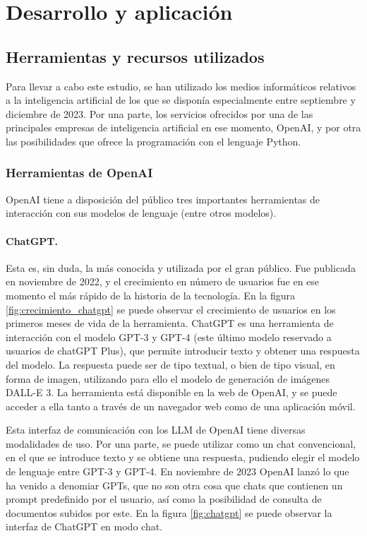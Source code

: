 \section{Desarrollo y aplicación}

\subsection{Herramientas y recursos utilizados}

Para llevar a cabo este estudio, se han utilizado los medios informáticos relativos a la inteligencia artificial de los que se disponía especialmente entre septiembre y diciembre de 2023. Por una parte, los servicios ofrecidos por una de las principales empresas de inteligencia artificial en ese momento, OpenAI, y por otra las posibilidades que ofrece la programación con el lenguaje Python. 

    \subsubsection{Herramientas de OpenAI}

    OpenAI tiene a disposición del público tres importantes herramientas de interacción con sus modelos de lenguaje (entre otros modelos). 

        \paragraph{ChatGPT.} Esta es, sin duda, la más conocida y utilizada por el gran público. Fue publicada en noviembre de 2022, y el crecimiento en número de usuarios fue en ese momento el más rápido de la historia de la tecnología. En la figura \ref{fig:crecimiento_chatgpt} se puede observar el crecimiento de usuarios en los primeros meses de vida de la herramienta. ChatGPT es una herramienta de interacción con el modelo GPT-3 y GPT-4 (este último modelo reservado a usuarios de chatGPT Plus), que permite introducir texto y obtener una respuesta del modelo. La respuesta puede ser de tipo textual, o bien de tipo visual, en forma de imagen, utilizando para ello el modelo de generación de imágenes DALL-E 3. La herramienta está disponible en la web de OpenAI, y se puede acceder a ella tanto a través de un navegador web como de una aplicación móvil.

        Esta interfaz de comunicación con los LLM de OpenAI tiene diversas modalidades de uso. Por una parte, se puede utilizar como un chat convencional, en el que se introduce texto y se obtiene una respuesta, pudiendo elegir el modelo de lenguaje entre GPT-3 y GPT-4. En noviembre de 2023 OpenAI lanzó lo que ha venido a denomiar GPTs, que no son otra cosa que chats que contienen un prompt predefinido por el usuario, así como la posibilidad de consulta de documentos subidos por este. En la figura \ref{fig:chatgpt} se puede observar la interfaz de ChatGPT en modo chat.

